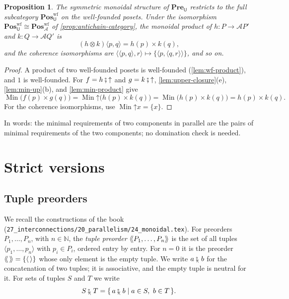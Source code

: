 \documentclass[11pt,a4paper]{article}
\theoremstyle{plain}
\newtheorem{proposition}[theorem]{Proposition}
\theoremstyle{definition}
\theoremstyle{remark}
\newcommand{\Cat}[1]{\mathbf{#1}}
\newcommand{\Pre}{\Cat{Pre}}
\newcommand{\Pos}{\Cat{Pos}}
\newcommand{\U}{\mathsf{U}}
\newcommand{\An}{\mathcal{A}}
\newcommand{\PreU}{\Pre_{\U}}
\newcommand{\PosA}{\Pos^{\mathrm{wf}}_{\An}}
\newcommand{\PosUwf}{\Pos^{\mathrm{wf}}_{\U}}
\providecommand{\llangle}{\mathopen{\langle\mkern-3.5mu\langle}}
\providecommand{\rrangle}{\mathclose{\rangle\mkern-3.5mu\rangle}}
\newcommand{\tL}[1]{\llangle #1 \rrangle}
\newcommand{\then}{\mathbin{\fatsemi}}
\newcommand{\tc}{\mathbin{\fatsemi_{\!\scriptscriptstyle\langle}}}
\newcommand{\tup}[1]{\langle #1 \rangle}
\newcommand{\etup}{\langle\,\rangle}
\newcommand{\up}{\mathord{\uparrow}}
\DeclareMathOperator{\Min}{Min}
\newcommand{\N}{\mathbb{N}}
\newcommand{\file}[1]{\nolinkurl{#1}}
\begin{document}
\begin{proposition}
    \label{prop:antichain-product}
    The symmetric monoidal structure of $\PreU$ restricts to the full subcategory $\PosUwf$ on the well-founded posets.
    Under the isomorphism $\PosUwf \cong \PosA$ of \cref{prop:antichain-category}, the monoidal product of $h \colon P \to \An P'$ and $k \colon Q \to \An Q'$ is
    \begin{equation}
        \label{eq:antichain-product}
        (h \otimes k)\tup{p,q} = h(p) \times k(q),
    \end{equation}
    and the coherence isomorphisms are $\tup{\tup{p,q},r} \mapsto \{\tup{p,\tup{q,r}}\}$, and so on.
\end{proposition}
\begin{proof}
    A product of two well-founded posets is well-founded (\cref{lem:wf-product}), and $1$ is well-founded.
    For $f = h \then \up$ and $g = k \then \up$, \cref{lem:upper-closure}(e), \cref{lem:min-up}(b), and \cref{lem:min-product} give
    \begin{equation*}
        \Min\bigl( f(p) \times g(q) \bigr) = \Min \up \bigl( h(p) \times k(q) \bigr) = \Min\bigl( h(p) \times k(q) \bigr) = h(p) \times k(q).
    \end{equation*}
    For the coherence isomorphisms, use $\Min \up x = \{x\}$.
\end{proof}

In words: the minimal requirements of two components in parallel are the pairs of minimal requirements of the two components; no domination check is needed.

\section{Strict versions}
\label{sec:strict}

\subsection{Tuple preorders}

We recall the constructions of the book (\file{27_interconnections/20_parallelism/24_monoidal.tex}).
For preorders $P_1, \ldots, P_n$, with $n \in \N$, the \emph{tuple preorder} $\tL{P_1, \ldots, P_n}$ is the set of all tuples $\tup{p_1, \ldots, p_n}$ with $p_i \in P_i$, ordered entry by entry.
For $n = 0$ it is the preorder $\tL{\,} = \{\etup\}$ whose only element is the empty tuple.
We write $a \tc b$ for the concatenation of two tuples; it is associative, and the empty tuple is neutral for it.
For sets of tuples $S$ and $T$ we write
\begin{equation}
    \label{eq:concat-sets}
    S \tc T = \{\, a \tc b \mid a \in S,\ b \in T \,\}.
\end{equation}
\end{document}
